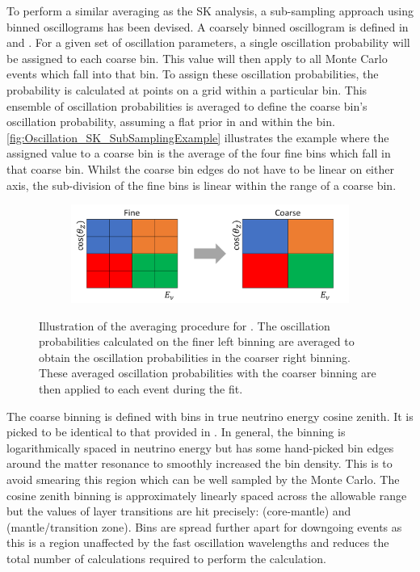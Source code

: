 To perform a similar averaging as the SK analysis, a sub-sampling approach using binned oscillograms has been devised. A coarsely binned oscillogram is defined in  and . For a given set of oscillation parameters, a single oscillation probability will be assigned to each coarse bin. This value will then apply to all Monte Carlo events which fall into that bin. To assign these oscillation probabilities, the probability is calculated at  points on a grid within a particular bin. This ensemble of oscillation probabilities is averaged to define the coarse bin's oscillation probability, assuming a flat prior in  and  within the bin. \autoref{fig:Oscillation_SK_SubSamplingExample} illustrates the  example where the assigned value to a coarse bin is the average of the four fine bins which fall in that coarse bin. Whilst the coarse bin edges do not have to be linear on either axis, the sub-division of the fine bins is linear within the range of a coarse bin.

\begin{figure}[h]
  \begin{subfigure}[t]{\textwidth}
    \includegraphics[width=\textwidth, trim={0mm 0mm 0mm 0mm}, clip,page=1]{Figures/Oscillation/SubSamplingExample.pdf}
  \end{subfigure}
  \caption{Illustration of the averaging procedure for . The oscillation probabilities calculated on the finer left binning are averaged to obtain the oscillation probabilities in the coarser right binning. These averaged oscillation probabilities with the coarser binning are then applied to each event during the fit.}
  \label{fig:Oscillation_SK_SubSamplingExample}
\end{figure}

The coarse binning is defined with  bins in true neutrino energy \quickmath{\times} cosine zenith. It is picked to be identical to that provided in \cite{t2k_tn_425}. In general, the binning is logarithmically spaced in neutrino energy but has some hand-picked bin edges around the matter resonance to smoothly increased the bin density. This is to avoid smearing this region which can be well sampled by the Monte Carlo. The cosine zenith binning is approximately linearly spaced across the allowable range but the values of layer transitions are hit precisely:  (core-mantle) and  (mantle/transition zone). Bins are spread further apart for downgoing events as this is a region unaffected by the fast oscillation wavelengths and reduces the total number of calculations required to perform the calculation.

